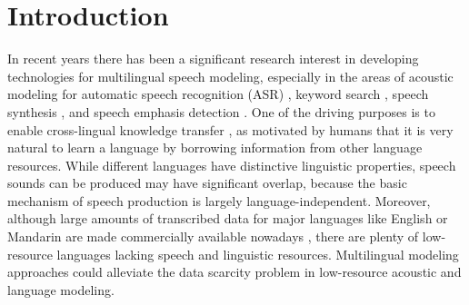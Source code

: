 \documentclass[a4paper]{article}
\begin{document}
\section{Introduction}
\label{Intro}
In recent years there has been a significant research interest in developing technologies for multilingual speech modeling, especially in the areas of acoustic modeling for  automatic speech recognition (ASR) \cite{Huang2013cross,ghoshal2013multilingual,karafiat2016multilingual,tong2017investigation,Zhou2017,ma2017improving}, keyword search \cite{ni2016rapid}, speech synthesis \cite{yu2016learning}, and speech emphasis detection \cite{ning2017learning}. One of the driving purposes is to enable cross-lingual knowledge transfer \cite{Huang2013cross}, as motivated by humans that it is very natural to learn a language by borrowing information from other language resources. While different languages have distinctive linguistic properties, speech sounds can be produced may have significant overlap, because the basic mechanism of speech production is largely language-independent.
Moreover, although large amounts of transcribed data for major languages like English or Mandarin are made commercially available nowadays \cite{paul1992design,li2004rasc863},
there are plenty of low-resource languages lacking  speech and linguistic resources. Multilingual modeling approaches
could  alleviate the data scarcity problem in low-resource acoustic \cite{Zhou2017,karafiat2016multilingual,yu2016learning} and language  \cite{ragni2016multi} modeling.
\end{document}
